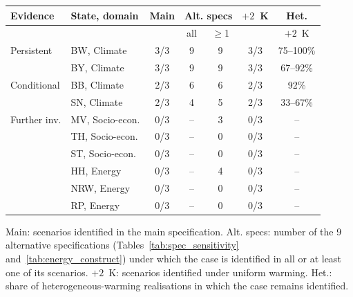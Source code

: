 \begin{tabular}{@{}>{\raggedright\arraybackslash}p{1.6cm}>{\raggedright\arraybackslash}p{2.9cm}ccccc@{}}
\toprule
Evidence & State, domain & Main & \multicolumn{2}{c}{Alt. specs} & $+2$~K & Het. \\
\cmidrule(lr){4-5}
 & & & all & $\ge$1 & & $+2$~K \\
\midrule
Persistent & BW, Climate & 3/3 & 9 & 9 & 3/3 & 75--100\% \\
 & BY, Climate & 3/3 & 9 & 9 & 3/3 & 67--92\% \\
\midrule
Conditional & BB, Climate & 2/3 & 6 & 6 & 2/3 & 92\% \\
 & SN, Climate & 2/3 & 4 & 5 & 2/3 & 33--67\% \\
\midrule
Further inv. & MV, Socio-econ. & 0/3 & -- & 3 & 0/3 & -- \\
 & TH, Socio-econ. & 0/3 & -- & 0 & 0/3 & -- \\
 & ST, Socio-econ. & 0/3 & -- & 0 & 0/3 & -- \\
 & HH, Energy & 0/3 & -- & 4 & 0/3 & -- \\
 & NRW, Energy & 0/3 & -- & 0 & 0/3 & -- \\
 & RP, Energy & 0/3 & -- & 0 & 0/3 & -- \\
\bottomrule
\end{tabular}
\par\smallskip\raggedright\scriptsize Main: scenarios identified in the main specification. Alt. specs: number of the 9 alternative specifications (Tables~\ref{tab:spec_sensitivity} and~\ref{tab:energy_construct}) under which the case is identified in all or at least one of its scenarios. $+2$~K: scenarios identified under uniform warming. Het.: share of heterogeneous-warming realisations in which the case remains identified.
